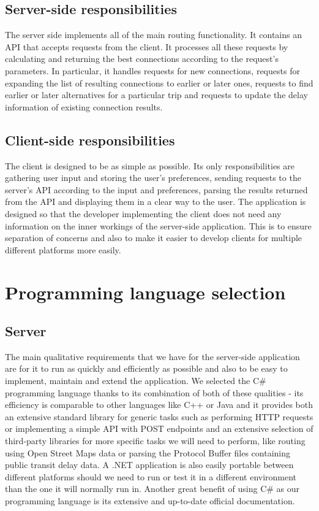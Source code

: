 \subsection{Server-side responsibilities}

The server side implements all of the main routing functionality. It contains an API that accepts requests from the client. It processes all these requests by calculating and returning the best connections according to the request's parameters. In particular, it handles requests for new connections, requests for expanding the list of resulting connections to earlier or later ones, requests to find earlier or later alternatives for a particular trip and requests to update the delay information of existing connection results. 

\subsection{Client-side responsibilities}

The client is designed to be as simple as possible. Its only responsibilities are gathering user input and storing the user's preferences, sending requests to the server's API according to the input and preferences, parsing the results returned from the API and displaying them in a clear way to the user. The application is designed so that the developer implementing the client does not need any information on the inner workings of the server-side application. This is to ensure separation of concerns and also to make it easier to develop clients for multiple different platforms more easily.



\section{Programming language selection}

\subsection{Server}

The main qualitative requirements that we have for the server-side application are for it to run as quickly and efficiently as possible and also to be easy to implement, maintain and extend the application. We selected the C# programming language thanks to its combination of both of these qualities - its efficiency is comparable to other languages like C++ or Java and it provides both an extensive standard library for generic tasks such as performing HTTP requests or implementing a simple API with POST endpoints and an extensive selection of third-party libraries for more specific tasks we will need to perform, like routing using Open Street Maps data or parsing the Protocol Buffer files containing public transit delay data. A .NET application is also easily portable between different platforms should we need to run or test it in a different environment than the one it will normally run in. Another great benefit of using C# as our programming language is its extensive and up-to-date official documentation.

